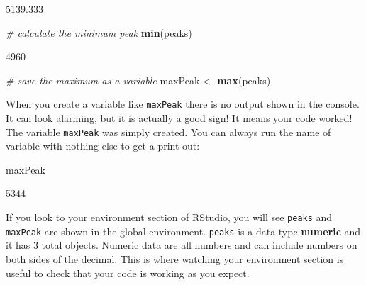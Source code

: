 \documentclass[
]{book}
\newenvironment{Shaded}{\begin{snugshade}}{\end{snugshade}}
\newcommand{\CommentTok}[1]{\textcolor[rgb]{0.56,0.35,0.01}{\textit{#1}}}
\newcommand{\FunctionTok}[1]{\textcolor[rgb]{0.13,0.29,0.53}{\textbf{#1}}}
\newcommand{\NormalTok}[1]{#1}
\newcommand{\OtherTok}[1]{\textcolor[rgb]{0.56,0.35,0.01}{#1}}
\theoremstyle{definition}
\theoremstyle{definition}
\theoremstyle{definition}
\theoremstyle{definition}
\theoremstyle{remark}
\begin{document}
\begin{Shaded}
\begin{Highlighting}[]
\NormalTok{[1] 5139.333}
\end{Highlighting}
\end{Shaded}

\begin{Shaded}
\begin{Highlighting}[]
\CommentTok{\# calculate the minimum peak}
\FunctionTok{min}\NormalTok{(peaks)}
\end{Highlighting}
\end{Shaded}

\begin{Shaded}
\begin{Highlighting}[]
\NormalTok{[1] 4960}
\end{Highlighting}
\end{Shaded}

\begin{Shaded}
\begin{Highlighting}[]
\CommentTok{\# save the maximum as a variable}
\NormalTok{maxPeak }\OtherTok{\textless{}{-}} \FunctionTok{max}\NormalTok{(peaks)}
\end{Highlighting}
\end{Shaded}

When you create a variable like \texttt{maxPeak} there is no output shown in the console. It can look alarming, but it is actually a good sign! It means your code worked! The variable \texttt{maxPeak} was simply created. You can always run the name of variable with nothing else to get a print out:

\begin{Shaded}
\begin{Highlighting}[]
\NormalTok{maxPeak}
\end{Highlighting}
\end{Shaded}

\begin{Shaded}
\begin{Highlighting}[]
\NormalTok{[1] 5344}
\end{Highlighting}
\end{Shaded}

If you look to your environment section of RStudio, you will see \texttt{peaks} and \texttt{maxPeak} are shown in the global environment. \texttt{peaks} is a data type \textbf{numeric} and it has 3 total objects. Numeric data are all numbers and can include numbers on both sides of the decimal. This is where watching your environment section is useful to check that your code is working as you expect.
\end{document}
